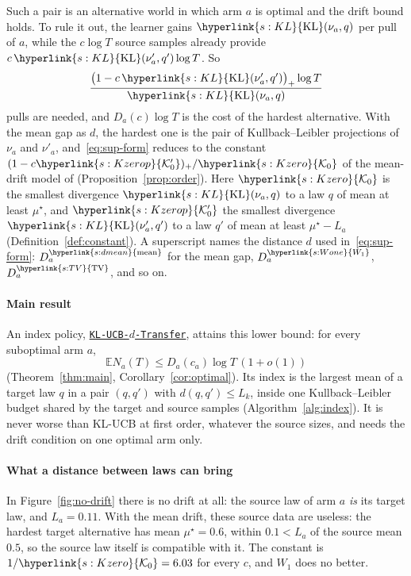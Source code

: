 \documentclass[11pt]{article}
\newcommand{\E}{\mathbb{E}}
\newcommand{\sy}[2]{{\hyperlink{#1}{#2}}}
\newcommand{\KL}{\sy{s:KL}{\mathrm{KL}}}
\newcommand{\TV}{\sy{s:TV}{\mathrm{TV}}}
\newcommand{\Wone}{\sy{s:Wone}{W_{1}}}
\newcommand{\dmean}{\sy{s:dmean}{\mathrm{mean}}}
\newcommand{\Ko}{\sy{s:Kzero}{\mathcal{K}_{0}}}
\newcommand{\Kop}{\sy{s:Kzerop}{\mathcal{K}'_{0}}}
\newcommand{\Alg}{\hyperref[alg:index]{\texttt{KL-UCB-$d$-Transfer}}}
\begin{document}
Such a pair is an alternative world in which arm $a$ is optimal and the drift bound holds. To rule
it out, the learner gains $\KL(\nu_a,q)$ per pull of $a$, while the $c\log T$ source samples
already provide $c\,\KL(\nu'_a,q')\log T$. So
\begin{equation*}
\frac{\big(1-c\,\KL(\nu'_a,q')\big)_+\log T}{\KL(\nu_a,q)}
\end{equation*}
pulls are needed, and $D_a(c)\log T$ is the cost of the hardest alternative. With the mean gap as
$d$, the hardest one is the pair of Kullback--Leibler projections of $\nu_a$ and $\nu'_a$,
and~\eqref{eq:sup-form} reduces to the constant $(1-c\Kop)_+/\Ko$ of the mean-drift
model of \citet{PMRM26} (Proposition~\ref{prop:order}). Here $\Ko$ is the smallest divergence
$\KL(\nu_a,q)$ to a law $q$ of mean at least $\mu^\star$, and $\Kop$ the smallest divergence
$\KL(\nu'_a,q')$ to a law $q'$ of mean at least $\mu^\star-L_a$ (Definition~\ref{def:constant}). A
superscript names the distance $d$ used in~\eqref{eq:sup-form}: $D^{\dmean}_a$ for the mean gap,
$D^{\Wone}_a$, $D^{\TV}_a$, and so on.

\paragraph{Main result} An index policy, \Alg{}, attains this lower bound: for every
suboptimal arm $a$,
\begin{equation*}
\E N_a(T)\le D_a(c_a)\log T\,(1+o(1))
\end{equation*}
(Theorem~\ref{thm:main}, Corollary~\ref{cor:optimal}). Its index is the largest mean of a target
law $q$ in a pair $(q,q')$ with $d(q,q')\le L_k$, inside one Kullback--Leibler budget shared by the
target and source samples (Algorithm~\ref{alg:index}). It is never worse than KL-UCB at first
order, whatever the source sizes, and needs the drift condition on one optimal arm only.

\paragraph{What a distance between laws can bring} In Figure~\ref{fig:no-drift} there is no drift
at all: the source law of arm $a$ \emph{is} its target law, and $L_a=0.11$. With the mean drift,
these source data are useless: the hardest target alternative has mean $\mu^\star=0.6$, within
$0.1<L_a$ of the source mean $0.5$, so the source law itself is compatible with it. The constant is
$1/\Ko=6.03$ for every $c$, and $W_1$ does no better.
\end{document}

